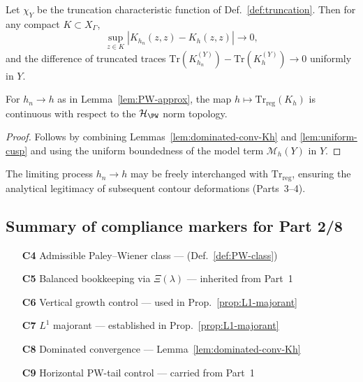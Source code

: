 \begin{lemma}
\label{lem:uniform-cusp}
Let $\chi_Y$ be the truncation characteristic function of Def.~\ref{def:truncation}. Then for any compact $K\subset X_\Gamma$,
\[
  \sup_{z\in K} |K_{h_n}(z,z)-K_h(z,z)| \to 0,
\]
and the difference of truncated traces $\mathrm{Tr}(K_{h_n}^{(Y)})-\mathrm{Tr}(K_h^{(Y)})\to 0$ uniformly in $Y$. \relax
\end{lemma}

\begin{proposition}\label{prop:Trreg-continuity}
For $h_n\to h$ as in Lemma~\ref{lem:PW-approx}, the map $h\mapsto \mathrm{Tr}_{\mathrm{reg}}(K_h)$ is continuous with respect to the $\mathcal{H}_{\PW}$ norm topology.
\end{proposition}

\begin{proof}\relax
Follows by combining Lemmas~\ref{lem:dominated-conv-Kh} and \ref{lem:uniform-cusp} and using the uniform boundedness of the model term $\mathcal{M}_h(Y)$ in $Y$. \relax
\end{proof}

\begin{invariant}
\label{inv:C8}
The limiting process $h_n\to h$ may be freely interchanged with $\mathrm{Tr}_{\mathrm{reg}}$, ensuring the analytical legitimacy of subsequent contour deformations (Parts~3–4). \relax
\end{invariant}

\subsection{Summary of compliance markers for Part 2/8}
\label{subsec:ch4-part2-compliance-summary} \relax

\begin{itemize}
  \item[\textbf{C4}] Admissible Paley–Wiener class — \checkmark{} (Def.~\ref{def:PW-class})  %
  \item[\textbf{C5}] Balanced bookkeeping via $\Xi(\lambda)$ — inherited from Part~1  %
  \item[\textbf{C6}] Vertical growth control — used in Prop.~\ref{prop:L1-majorant}  %
  \item[\textbf{C7}] $L^1$ majorant — established in Prop.~\ref{prop:L1-majorant}  %
  \item[\textbf{C8}] Dominated convergence — Lemma~\ref{lem:dominated-conv-Kh}  %
  \item[\textbf{C9}] Horizontal PW-tail control — carried from Part~1  %
\end{itemize}

